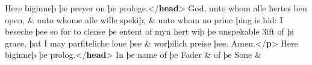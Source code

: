 \begin{shaded}
\mbox{}\newline 
\hspace*{1em}Here biginneþ þe preyer on þe prologe.{</\textbf{head}>}\mbox{}\newline 
\hspace*{1em}God, unto whom alle hertes ben open, \& unto whome alle wille\mbox{}\newline 
\hspace*{1em}\hspace*{1em}\hspace*{1em}\hspace*{1em} spekiþ, \& unto whom no priue þing is hid: I beseche\mbox{}\newline 
\hspace*{1em}\hspace*{1em}\hspace*{1em}\hspace*{1em} þee so for to clense þe entent of myn hert wiþ þe\mbox{}\newline 
\hspace*{1em}\hspace*{1em}\hspace*{1em}\hspace*{1em} unspekable 3ift of þi grace, þat I may parfiteliche\mbox{}\newline 
\hspace*{1em}\hspace*{1em}\hspace*{1em}\hspace*{1em} loue þee \& worþilich preise þee. Amen.{</\textbf{p}>}\mbox{}\newline 
{}\mbox{}\newline 
{}\mbox{}\newline 
\hspace*{1em}Here biginneþ þe prolog.{</\textbf{head}>}\mbox{}\newline 
\hspace*{1em}In þe name of þe Fader \& of þe Sone \&\mbox{}\newline 

\end{shaded}

